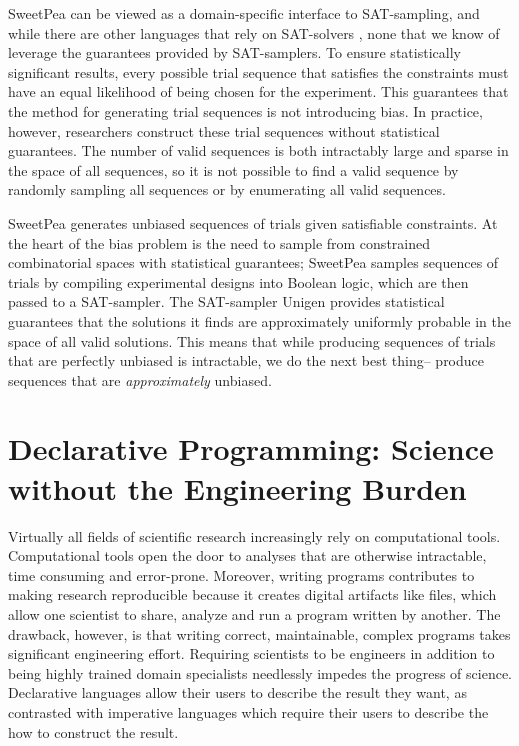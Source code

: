 SweetPea can be viewed as a domain-specific interface to SAT-sampling, and while there are other languages that rely on SAT-solvers \cite{torlak2014lightweight}, none that we know of leverage the guarantees provided by SAT-samplers. To ensure statistically significant results, every possible trial sequence that satisfies the constraints must have an equal likelihood of being chosen for the experiment. This guarantees that the method for generating trial sequences is not introducing bias. In practice, however, researchers construct these trial sequences without statistical guarantees. The number of valid sequences is both intractably large and sparse in the space of all sequences, so it is not possible to find a valid sequence by randomly sampling all sequences or by enumerating all valid sequences.

SweetPea generates unbiased sequences of trials given satisfiable constraints. At the heart of the bias problem is the need to sample from constrained combinatorial spaces with statistical guarantees; SweetPea samples sequences of trials by compiling experimental designs into Boolean logic, which are then passed to a SAT-sampler. The SAT-sampler Unigen \cite{meel2016constrained}
provides statistical guarantees that the solutions it finds are approximately uniformly probable in the space of all valid solutions. This means that while producing sequences of trials that are perfectly unbiased is intractable, we do the next best thing-- produce sequences that are \emph{approximately} unbiased.

\section{Declarative Programming: Science without the Engineering Burden}

Virtually all fields of scientific research increasingly rely on computational tools. Computational tools open the door to analyses that are otherwise intractable, time consuming and error-prone. Moreover, writing programs contributes to making research reproducible because it creates digital artifacts like files, which allow one scientist to share, analyze and run a program written by another. The drawback, however, is that writing correct, maintainable, complex programs takes significant engineering effort. Requiring scientists to be engineers in addition to being highly trained domain specialists needlessly impedes the progress of science. Declarative languages allow their users to describe the result they want, as contrasted with imperative languages which require their users to describe the how to construct the result.

